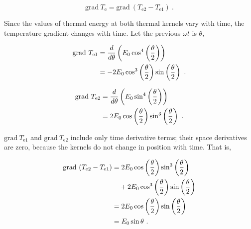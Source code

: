 \documentclass[%
 reprint,
 amsmath,amssymb,
 aps,
]{revtex4-1}
\numberwithin{equation}{section}%
\begin{document}
    \begin{equation}
            \mathrm{grad} \ T_{\mathrm{e}} = \mathrm{grad} \ ( T_{\mathrm{e2}} - T_{\mathrm{e1}} )
            \ .
            \label{e3_k_grad_Te2-Te1}
    \end{equation}

    Since the values of thermal energy at both thermal kernels vary with time, the temperature gradient changes with time. Let the previous $\omega t$ is $\theta$,

        \begin{align}
            \mathrm{grad} \ T_{\mathrm{e1}}
                &= \frac{d}{d \theta} \left( E_{0} \cos^{4} \left( \frac{\theta}{2} \right) \right) \notag \\
                &= - 2 E_{0} \cos^{3} \left( \frac{\theta}{2} \right) \sin \left( \frac{\theta}{2} \right)
                \ .
                \label{e3_gradT_e1}
        \end{align}

        \begin{align}
            \mathrm{grad} \ T_{\mathrm{e2}}
                &= \frac{d}{d \theta} \left( E_{0} \sin^{4} \left( \frac{\theta}{2} \right) \right) \notag \\
                &=   2 E_{0} \cos \left( \frac{\theta}{2} \right) \sin^{3} \left( \frac{\theta}{2} \right)
                \ .
                \label{e3_gradT_e2}
        \end{align}        

    $\mathrm{grad} \ T_{\mathrm{e1}}$ and $\mathrm{grad} \ T_{\mathrm{e2}}$ include only time derivative terms; their space derivatives are zero, because the kernels do not change in position with time. That is,

        \begin{align}
            \mathrm{grad} \ (T_{\mathrm{e2}} - T_{\mathrm{e1}})
                &= 2 E_{0} \cos \left( \frac{\theta}{2} \right) \sin^{3} \left( \frac{\theta}{2} \right) \notag \\
                & \quad + 2 E_{0} \cos^{3} \left( \frac{\theta}{2} \right) \sin \left( \frac{\theta}{2} \right) \notag \\
                &= 2 E_{0} \cos \left( \frac{\theta}{2} \right) \sin \left( \frac{\theta}{2} \right) \notag \\
                &= E_{0} \sin \theta
                \ .
            \label{e3_simple_harmonic_motion}
        \end{align}
\end{document}
